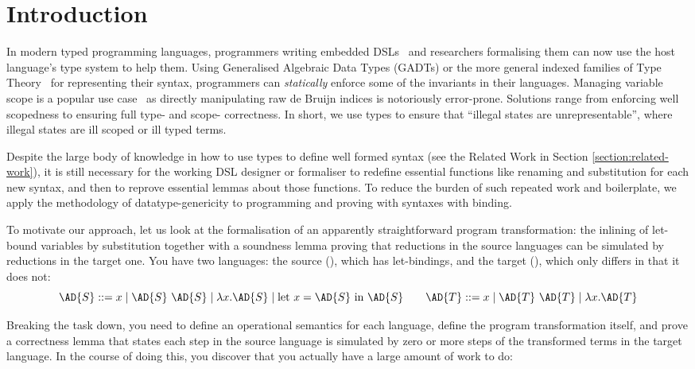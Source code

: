 
\newcommand{\semrec}{\AR{Semantics}}
\newcommand{\semfun}{\AF{semantics}}

\section{Introduction}

In modern typed programming languages, programmers writing embedded
DSLs~\cite{hudak1996building} and researchers formalising them can now
use the host language's type system to help them. Using Generalised
Algebraic Data Types (GADTs) or the more general indexed families of
Type Theory~\cite{dybjer1994inductive} for representing their syntax,
programmers can \emph{statically} enforce some of the invariants in
their languages. Managing variable scope is a popular use
case~\cite{altenkirch1999monadic} as directly manipulating raw de
Bruijn indices is notoriously error-prone. Solutions range from enforcing
well scopedness to ensuring full type- and scope- correctness. In short,
we use types to ensure that ``illegal states are unrepresentable'', where
illegal states are ill scoped or ill typed terms.

Despite the large body of knowledge in how to use types to define well
formed syntax (see the Related Work in Section
\ref{section:related-work}), it is still necessary for the working DSL
designer or formaliser to redefine essential functions like renaming
and substitution for each new syntax, and then to reprove essential
lemmas about those functions. To reduce the burden of such repeated
work and boilerplate, we apply the methodology of datatype-genericity to
programming and proving with syntaxes with binding.

To motivate our approach, let us look at the formalisation of an
apparently straightforward program transformation: the inlining of
let-bound variables by substitution together with a soundness lemma
proving that reductions in the source languages can be simulated by
reductions in the target one. You have two languages: the source
(), which has let-bindings, and the target (), which only
differs in that it does not:
\begin{displaymath}
  \AD{S} ::= x \mid \AD{S}~\AD{S} \mid \lambda x. \AD{S} \mid \textrm{let }x=\AD{S}\textrm{ in }\AD{S}
  \qquad
  \AD{T} ::= x \mid \AD{T}~\AD{T} \mid \lambda x. \AD{T}
\end{displaymath}

Breaking the task down, you need to define an operational semantics for
each language, define the program transformation itself, and prove a
correctness lemma that states each step in the source language is
simulated by zero or more steps of the transformed terms in the target
language. In the course of doing this, you discover that you actually
have a large amount of work to do:

